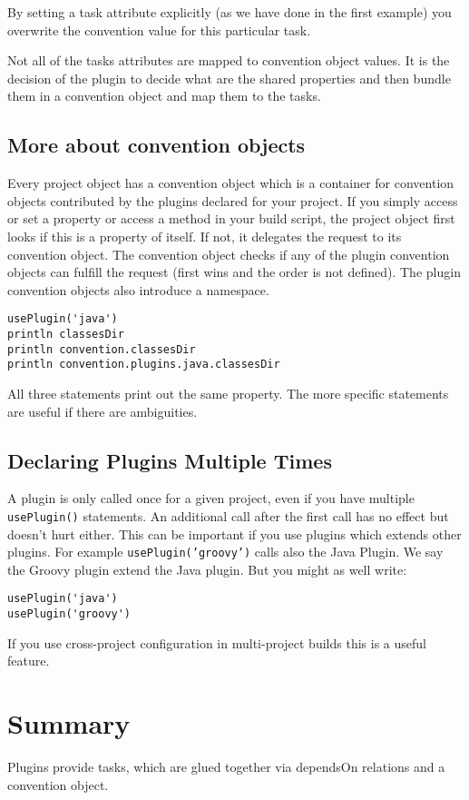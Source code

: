 By setting a task attribute explicitly (as we have done in the first example) you overwrite the convention value for this particular task.

Not all of the tasks attributes are mapped to convention object values. It is the decision of the plugin to decide what are the shared properties and then bundle them in a convention object and map them to the tasks.

\subsection{More about convention objects} %
\label{sub:more_about_convention_objects}
Every project object has a convention object which is a container for convention objects contributed by the plugins declared for your project. If you simply access or set a property or access a method in your build script, the project object first looks if this is a property of itself. If not, it delegates the request to its convention object. The convention object checks if any of the plugin convention objects can fulfill the request (first wins and the order is not defined). The plugin convention objects also introduce a namespace.   
\begin{Verbatim}
usePlugin('java')
println classesDir
println convention.classesDir
println convention.plugins.java.classesDir
\end{Verbatim}   
All three statements print out the same property. The more specific statements are useful if there are ambiguities.  

\subsection{Declaring Plugins Multiple Times} %
\label{sub:declaring_plugins_multiple_times}
A plugin is only called once for a given project, even if you have multiple \texttt{usePlugin()} statements. An additional call after the first call has no effect but doesn't hurt either. This can be important if you use plugins which extends other plugins. For example \texttt{usePlugin('groovy')} calls also the Java Plugin. We say the Groovy plugin extend the Java plugin. But you might as well write:
\begin{Verbatim}
usePlugin('java')
usePlugin('groovy')
\end{Verbatim}
If you use cross-project configuration in multi-project builds this is a useful feature.

\section{Summary} %
Plugins provide tasks, which are glued together via dependsOn relations and a convention object. 
